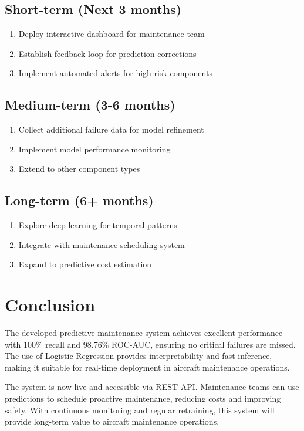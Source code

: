 \documentclass[11pt,a4paper]{article}
\begin{document}
\subsection{Short-term (Next 3 months)}
\begin{enumerate}
    \item Deploy interactive dashboard for maintenance team
    \item Establish feedback loop for prediction corrections
    \item Implement automated alerts for high-risk components
\end{enumerate}

\subsection{Medium-term (3-6 months)}
\begin{enumerate}
    \item Collect additional failure data for model refinement
    \item Implement model performance monitoring
    \item Extend to other component types
\end{enumerate}

\subsection{Long-term (6+ months)}
\begin{enumerate}
    \item Explore deep learning for temporal patterns
    \item Integrate with maintenance scheduling system
    \item Expand to predictive cost estimation
\end{enumerate}

\section{Conclusion}

The developed predictive maintenance system achieves excellent performance with 100\% recall and 98.76\% ROC-AUC, ensuring no critical failures are missed. The use of Logistic Regression provides interpretability and fast inference, making it suitable for real-time deployment in aircraft maintenance operations.

The system is now live and accessible via REST API. Maintenance teams can use predictions to schedule proactive maintenance, reducing costs and improving safety. With continuous monitoring and regular retraining, this system will provide long-term value to aircraft maintenance operations.
\end{document}
